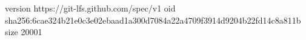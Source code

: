 version https://git-lfs.github.com/spec/v1
oid sha256:6cae324b21e0c3e02ebaad1a300d7084a22a4709f3914d9204b22fd14c8a811b
size 20001

